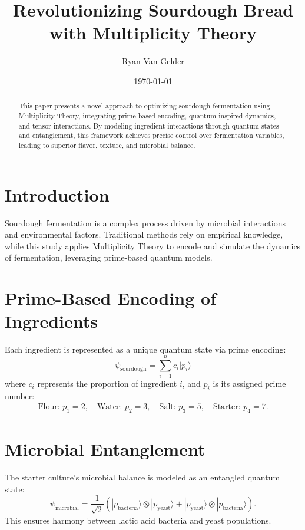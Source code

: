 \documentclass{article}
\theoremstyle{plain}
\begin{document}
\title{Revolutionizing Sourdough Bread \\ with Multiplicity Theory}

\author{Ryan Van Gelder}
\date{\today}
\maketitle


\begin{abstract}
This paper presents a novel approach to optimizing sourdough fermentation using Multiplicity Theory, integrating prime-based encoding, quantum-inspired dynamics, and tensor interactions. By modeling ingredient interactions through quantum states and entanglement, this framework achieves precise control over fermentation variables, leading to superior flavor, texture, and microbial balance.
\end{abstract}

\section{Introduction}
Sourdough fermentation is a complex process driven by microbial interactions and environmental factors. Traditional methods rely on empirical knowledge, while this study applies Multiplicity Theory to encode and simulate the dynamics of fermentation, leveraging prime-based quantum models.

\section{Prime-Based Encoding of Ingredients}
Each ingredient is represented as a unique quantum state via prime encoding:\\
\[ \psi_{\text{sourdough}} = \sum_{i=1}^{n} c_i | p_i \rangle \]
where \( c_i \) represents the proportion of ingredient \( i \), and \( p_i \) is its assigned prime number:\\
\begin{align*}
\text{Flour: } p_1 = 2, \quad \text{Water: } p_2 = 3, \quad \text{Salt: } p_3 = 5, \quad \text{Starter: } p_4 = 7.
\end{align*}

\section{Microbial Entanglement}
The starter culture's microbial balance is modeled as an entangled quantum state:\\
\[
\psi_{\text{microbial}} = \frac{1}{\sqrt{2}} (| p_{\text{bacteria}} \rangle \otimes | p_{\text{yeast}} \rangle + | p_{\text{yeast}} \rangle \otimes | p_{\text{bacteria}} \rangle).
\]
This ensures harmony between lactic acid bacteria and yeast populations.
\end{document}
